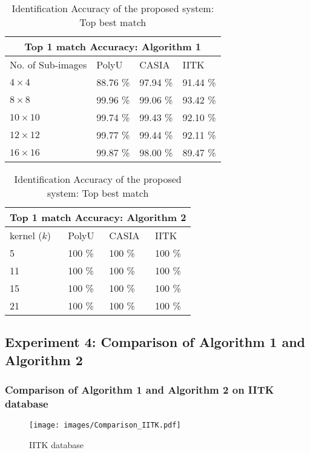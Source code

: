 \documentclass{beamer}
\begin{document}
\begin{frame}
\begin{table}[ht]
\centering 
\begin{tabular}{| l | l | l | l |}
    \hline
    \multicolumn{4}{|c|}{Top 1 match Accuracy: Algorithm 1}\\
    \hline
    No. of Sub-images & PolyU & CASIA & IITK \\ \hline
    $4 \times 4$      &  88.76 \%& 97.94 \% & 91.44 \%\\ \hline
    $8 \times 8$      &  99.96 \%& 99.06 \% & 93.42 \%\\ \hline
    $10 \times 10$    &  99.74 \%& 99.43 \% & 92.10 \%\\ \hline
    $12 \times 12$    &  99.77 \%& 99.44 \% & 92.11 \%\\ \hline
    $16 \times 16$    &  99.87 \%& 98.00 \% & 89.47 \%\\
    \hline
\end{tabular}
\caption{Identification Accuracy of the proposed system: Top best match\label{table:id_accuracy_algorithm1}}
\end{table}

\begin{table}[ht]
\centering 
\begin{tabular}{| l | l | l | l |}
    \hline
    \multicolumn{4}{|c|}{Top 1 match Accuracy: Algorithm 2}\\
    \hline
    kernel ($k$) & PolyU & CASIA & IITK \\ \hline
    5 		&  100 \%	& 100 \%      & 100 \% \\ \hline
    11		&  100 \%	& 100 \%	& 100 \%\\ \hline
    15 		&  100 \%	& 100 \% 	& 100 \%\\ \hline
    21 		&  100 \%	& 100 \% 	& 100 \%\\ 
    \hline
\end{tabular}
\caption{Identification Accuracy of the proposed system: Top best match\label{table:id_accuracy_algorithm2}}
\end{table}
\end{frame}

\subsection{Experiment 4: Comparison of Algorithm 1 and Algorithm 2}
\begin{frame}
\frametitle{Comparison of Algorithm 1 and Algorithm 2 on IITK database}
\begin{figure}
	\begin{center}
	\texttt{[image: images/Comparison\_IITK.pdf]}
	\caption{IITK database}
	\end{center}
	\end{figure}
\end{frame}
\end{document}
